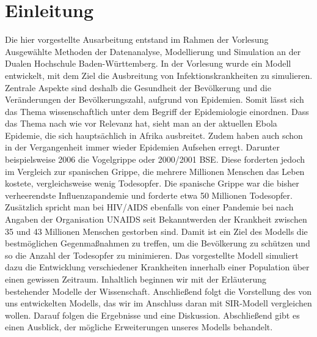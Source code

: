 \section*{Einleitung}

Die hier vorgestellte Ausarbeitung entstand im Rahmen der Vorlesung \glqq Ausgewählte Methoden der Datenanalyse, Modellierung und Simulation\grqq\; an der Dualen Hochschule Baden-Württemberg.
In der Vorlesung wurde ein Modell entwickelt, mit dem Ziel die Ausbreitung von Infektionskrankheiten zu simulieren.
Zentrale Aspekte sind deshalb die Gesundheit der Bevölkerung und die Veränderungen der Bevölkerungszahl, aufgrund von Epidemien. Somit lässt sich das Thema wissenschaftlich unter dem Begriff der Epidemiologie einordnen.
Dass das Thema nach wie vor Relevanz hat, sieht man an der aktuellen Ebola Epidemie, die sich hauptsächlich in Afrika ausbreitet. Zudem haben auch schon in der Vergangenheit immer wieder Epidemien Aufsehen erregt. Darunter beispielsweise 2006 die Vogelgrippe\cite{gehlhoff2007chronik}
oder 2000/2001 BSE\cite{Spon:2014}. Diese forderten jedoch im Vergleich zur spanischen Grippe, die mehrere Millionen Menschen das Leben kostete, vergleichsweise wenig Todesopfer. Die spanische Grippe war die bisher verheerendste Influenzapandemie und forderte etwa 50 Millionen Todesopfer\cite{welt:2014}. Zusätzlich spricht man bei HIV/AIDS ebenfalls von einer Pandemie bei nach Angaben der Organisation UNAIDS seit Bekanntwerden der Krankheit zwischen 35 und 43 Millionen Menschen gestorben sind\cite{UNAIDS:2014}.
Damit ist ein Ziel des Modells die bestmöglichen Gegenmaßnahmen zu treffen, um die Bevölkerung zu schützen und so die Anzahl der Todesopfer zu minimieren.
Das vorgestellte Modell simuliert dazu die Entwicklung verschiedener Krankheiten innerhalb einer Population über einen gewissen Zeitraum. 
Inhaltlich beginnen wir mit der Erläuterung bestehender Modelle der Wissenschaft. Anschließend folgt die Vorstellung des von uns entwickelten Modells, das wir im Anschluss daran mit SIR-Modell vergleichen wollen. Darauf folgen die Ergebnisse und eine Diskussion. Abschließend gibt es einen Ausblick, der mögliche Erweiterungen unseres Modells behandelt. 

